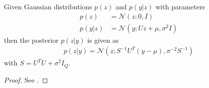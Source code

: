 \begin{lemma}
  Given Gaussian distributions $p(z)$ and $p(y | z)$ with parameters
  \begin{align}
    p(z) &= \mathcal{N}(z; 0, I)\\
    p(y | z) &= \mathcal{N}(y; Uz + \mu, \sigma^2I)
  \end{align}
  then the posterior $p(z | y)$ is given as
  \begin{align}
    p(z | y) = \mathcal{N}(z; S^{-1} U^T(y - \mu), \sigma^{-2} S^{-1})
  \end{align}
  with $S = U^T U + \sigma^2I_Q$.
\end{lemma}

\begin{proof}
  See \cite[Section~2.3]{Bishop:2006}.
\end{proof}

